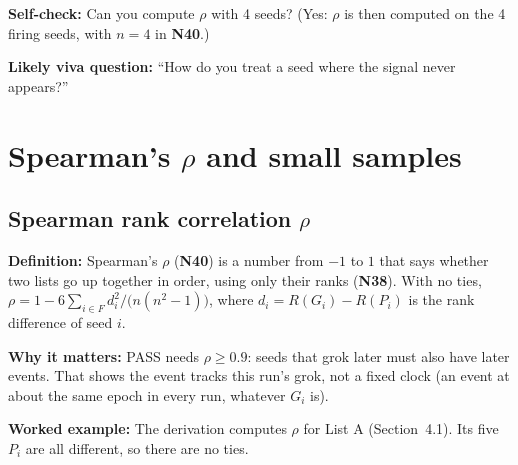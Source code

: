 \documentclass[11pt,a4paper,oneside,openany]{report}
\newcommand{\gl}[1]{\textbf{#1}}   %
\newcommand{\fdef}{\textbf{Definition:} }
\newcommand{\fwhy}{\par\textbf{Why it matters:} }
\newcommand{\fex}{\par\textbf{Worked example:} }
\newcommand{\fself}{\par\textbf{Self-check:} }
\newcommand{\fviva}{\par\textbf{Likely viva question:} }
\begin{document}
\fself Can you compute $\rho$ with 4 seeds? (Yes: $\rho$ is then computed on the 4 firing seeds, with $n = 4$ in \gl{N40}.)
\fviva ``How do you treat a seed where the signal never appears?''

\chapter{Spearman's $\rho$ and small samples}

\section{Spearman rank correlation $\rho$}
\fdef Spearman's $\rho$ (\gl{N40}) is a number from $-1$ to $1$ that says whether two lists go up together in order, using only their ranks (\gl{N38}). With no ties, $\rho = 1 - 6\sum_{i \in F} d_i^2 / \big(n(n^2-1)\big)$, where $d_i = R(G_i) - R(P_i)$ is the rank difference of seed $i$.
\fwhy PASS needs $\rho \ge 0.9$: seeds that grok later must also have later events. That shows the event tracks this run's grok, not a fixed clock (an event at about the same epoch in every run, whatever $G_i$ is).
\fex The derivation computes $\rho$ for List A (Section~4.1). Its five $P_i$ are all different, so there are no ties.
\end{document}
